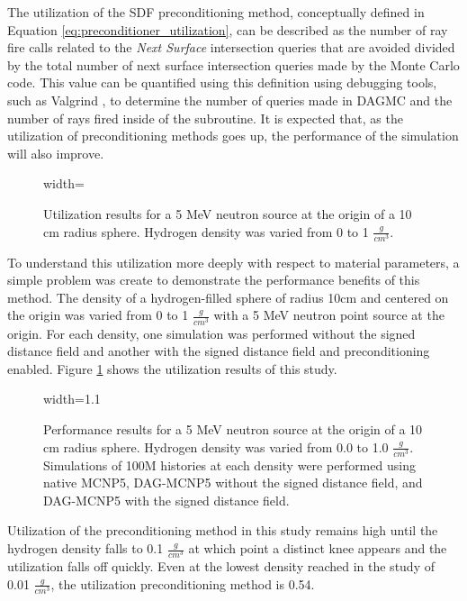 The utilization of the SDF preconditioning method, conceptually defined in
Equation \eqref{eq:preconditioner_utilization}, can be described as the number of
ray fire calls related to the \textit{Next Surface} intersection queries that
are avoided divided by the total number of next surface intersection queries
made by the Monte Carlo code. This value can be quantified using this definition
using debugging tools, such as Valgrind \cite{Pena_2016}, to determine the
number of queries made in DAGMC and the number of rays fired inside of the
subroutine.  It is expected that, as the utilization of preconditioning methods
goes up, the performance of the simulation will also improve.

\begin{figure}[ht]
  \centering
  {width=\textwidth}
  \caption[Utilization results for a simple SDF test case.]{Utilization results
    for a 5 MeV neutron source at the origin of a 10 cm radius sphere. Hydrogen
    density was varied from 0 to 1 $\frac{g}{cm^3}$.}
  \label{fig:sphere_hydrogen_density_study_util}
\end{figure}

To understand this utilization more deeply with respect to material parameters,
a simple problem was create to demonstrate the performance benefits of this
method. The density of a hydrogen-filled sphere of radius 10cm and centered on
the origin was varied from 0 to 1 $\frac{g}{cm^3}$ with a 5 MeV neutron point
source at the origin. For each density, one simulation was performed without the
signed distance field and another with the signed distance field and
preconditioning enabled. Figure \ref{fig:sphere_hydrogen_density_study_util}
shows the utilization results of this study.

\begin{figure}[ht]
  \centering
  {width=1.1\textwidth}
  \caption[A DAG-MCNP test simulation applying the signed distance
    field.]{Performance results for a 5 MeV neutron source at the origin of a 10
    cm radius sphere. Hydrogen density was varied from 0.0 to 1.0
    $\frac{g}{cm^3}$. Simulations of 100M histories at each density were
    performed using native MCNP5, DAG-MCNP5 without the signed distance field,
    and DAG-MCNP5 with the signed distance field.}
  \label{fig:sphere_hydrogen_density_study_perf}
\end{figure}

Utilization of the preconditioning method in this study remains high until the
hydrogen density falls to 0.1 $\frac{g}{cm^3}$ at which point a distinct knee
appears and the utilization falls off quickly. Even at the lowest density
reached in the study of 0.01 $\frac{g}{cm^3}$, the utilization preconditioning
method is 0.54.



